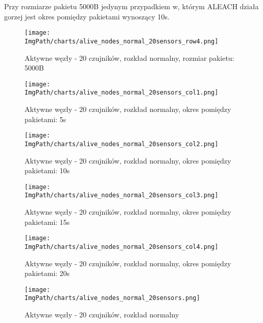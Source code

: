 Przy rozmiarze pakietu 5000B jedynym przypadkiem w, którym ALEACH działa gorzej jest okres pomiędzy pakietami wynoszący 10s.

\begin{figure}[H]
	\begin{center}
		\texttt{[image: \\ImgPath/charts/alive\_nodes\_normal\_20sensors\_row4.png]}
	\end{center}
	\caption{Aktywne węzły - 20 czujników, rozkład normalny, rozmiar pakietu: 5000B}
\end{figure}

\begin{figure}[H]
	\begin{center}
		\texttt{[image: \\ImgPath/charts/alive\_nodes\_normal\_20sensors\_col1.png]}
	\end{center}
	\caption{Aktywne węzły - 20 czujników, rozkład normalny, okres pomiędzy pakietami: 5s}
\end{figure}

\begin{figure}[H]
	\begin{center}
		\texttt{[image: \\ImgPath/charts/alive\_nodes\_normal\_20sensors\_col2.png]}
	\end{center}
	\caption{Aktywne węzły - 20 czujników, rozkład normalny, okres pomiędzy pakietami: 10s}
\end{figure}

\begin{figure}[H]
	\begin{center}
		\texttt{[image: \\ImgPath/charts/alive\_nodes\_normal\_20sensors\_col3.png]}
	\end{center}
	\caption{Aktywne węzły - 20 czujników, rozkład normalny, okres pomiędzy pakietami: 15s}
\end{figure}

\begin{figure}[H]
	\begin{center}
		\texttt{[image: \\ImgPath/charts/alive\_nodes\_normal\_20sensors\_col4.png]}
	\end{center}
	\caption{Aktywne węzły - 20 czujników, rozkład normalny, okres pomiędzy pakietami: 20s}
\end{figure}

\begin{figure}[H]
	\begin{center}
		\texttt{[image: \\ImgPath/charts/alive\_nodes\_normal\_20sensors.png]}
	\end{center}
	\caption{Aktywne węzły - 20 czujników, rozkład normalny}
\end{figure}